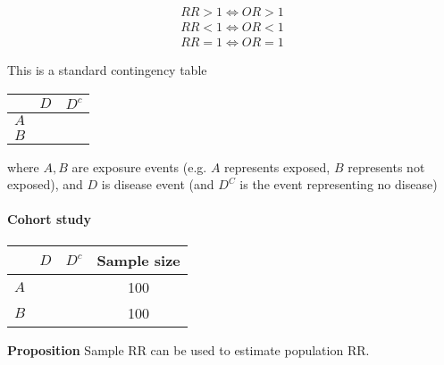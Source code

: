 \documentclass{article}
\begin{document}
\begin{align*}
	RR>1\iff OR>1\\
	RR<1\iff OR<1\\
	RR=1\iff OR=1
\end{align*}

This is a standard contingency table
\begin{center}
	\begin{tabular}{c|c|c|}
	& $D$ & $D^c$\\
	\hline
	$A$ & &\\
	\hline
	$B$ & &\\
	\hline
	\end{tabular}
\end{center}
where $A,B$ are exposure events (e.g. $A$ represents exposed, $B$ represents not exposed), and $D$ is disease event (and $D^C$ is the event representing no disease)

\paragraph{Cohort study}
\begin{center}
	\begin{tabular}{c|c|c|c|}
	& $D$ & $D^c$ & Sample size\\
	\hline
	$A$ & & & 100\\
	\hline
	$B$ & & & 100\\
	\hline
	\end{tabular}
\end{center}

\textbf{Proposition} Sample RR can be used to estimate population RR.
\end{document}
